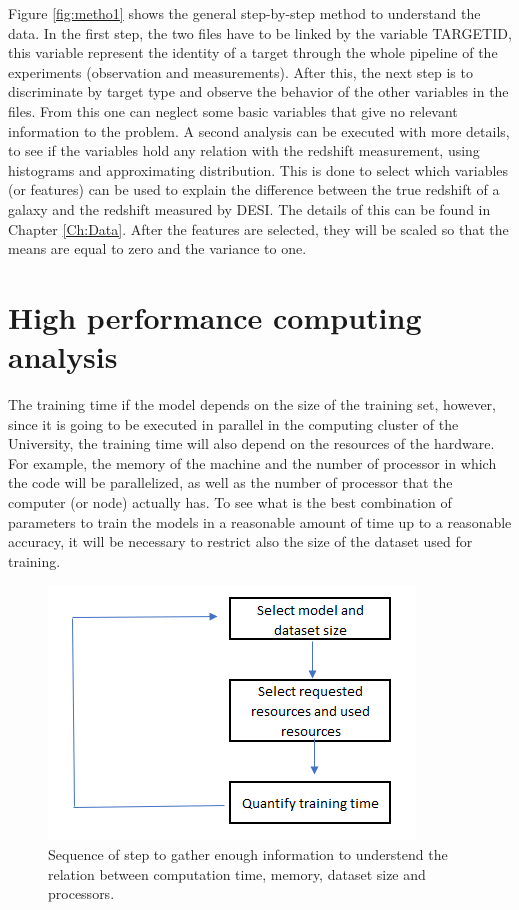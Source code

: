 Figure \ref{fig:metho1} shows the general step-by-step method to understand the data. In the first step, the two files have to be linked by the variable TARGETID, this variable represent the identity of a target through the whole pipeline of the experiments (observation and measurements). After this, the next step is to discriminate by target type and observe the behavior of the other variables in the files. From this one can neglect some basic variables that give no relevant information to the problem. A second analysis can be executed with more details, to see if the variables hold any relation with the redshift measurement, using histograms and approximating distribution. This is done to select which variables (or features) can be used to explain the difference between the true redshift of a galaxy and the redshift measured by DESI. The details of this can be found in Chapter \ref{Ch:Data}. After the features are selected, they will be scaled so that the means are equal to zero and the variance to one. 

\section{High performance computing analysis}

The training time if the model depends on the size of the training set, however, since it is going to be executed in parallel in the computing cluster of the University, the training time will also depend on the resources of the hardware. For example, the memory of the machine and the number of processor in which the code will be parallelized, as well as the number of processor that the computer (or node) actually has. To see what is the best combination of parameters to train the models in a reasonable amount of time up to a reasonable accuracy, it will be necessary to restrict also the size of the dataset used for training.

\begin{figure}[h!]
	\centering
	\includegraphics[width=0.7\linewidth]{TeX_files/Imagenes/metho_2}
	\caption{Sequence of step to gather enough information to understend the relation between computation time, memory, dataset size and processors.}
	\label{fig:metho2}
\end{figure}

